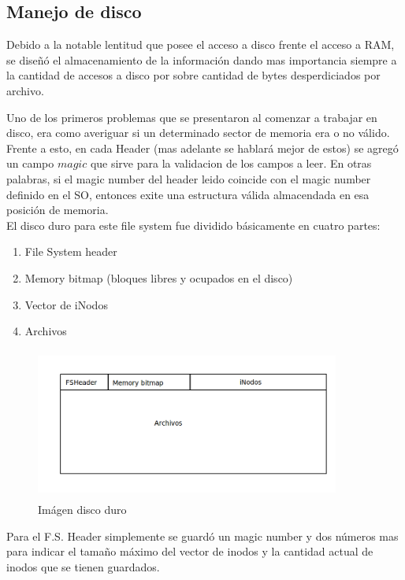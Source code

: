 \documentclass[english]{article}
\begin{document}
\subsection{Manejo de disco}

Debido a la notable lentitud que posee el acceso a disco frente el
acceso a RAM, se diseñó el almacenamiento de la información dando
mas importancia siempre a la cantidad de accesos a disco por sobre
cantidad de bytes desperdiciados por archivo.

Uno de los primeros problemas que se presentaron al comenzar a trabajar
en disco, era como averiguar si un determinado sector de memoria era
o no válido. Frente a esto, en cada Header (mas adelante se hablará
mejor de estos) se agregó un campo $magic$ que sirve para la validacion
de los campos a leer. En otras palabras, si el magic number del header
leido coincide con el magic number definido en el SO, entonces exite
una estructura válida almacendada en esa posición de memoria. \\


El disco duro para este file system fue dividido básicamente en cuatro
partes:
\begin{enumerate}
\item File System header
\item Memory bitmap (bloques libres y ocupados en el disco)
\item Vector de iNodos
\item Archivos
\end{enumerate}

\begin{figure}[H]
\begin{center}
\includegraphics[width=10cm,height=5cm,keepaspectratio]{Imagen_disco}

\caption{Imágen disco duro}
\end{center}
\end{figure}


Para el F.S. Header simplemente se guardó un magic number y dos números
mas para indicar el tamaño máximo del vector de inodos y la cantidad
actual de inodos que se tienen guardados.
\end{document}
